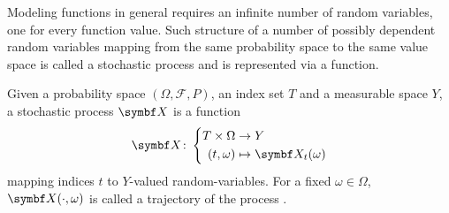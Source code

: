 Modeling functions in general requires an infinite number of random variables, one for every function value.
Such structure of a number of possibly dependent random variables mapping from the same probability space to the same value space is called a stochastic process and is represented via a function.
\begin{definition}
    \label{def:gp:stochastic_process}
    Given a probability space $(\Omega, \mathcal{F}, P)$, an index set $T$ and a measurable space $Y$, a stochastic process $\rv{X}$ is a function
    \begin{align}
        \rv{X} \colon \left\{\begin{aligned}
            T \times \Omega & \to Y                    \\
            (t, \omega)     & \mapsto \rv{X}_t(\omega)
        \end{aligned}\right.
    \end{align}
    mapping indices $t$ to $Y$-valued random-variables.
    For a fixed $\omega \in \Omega$, $\rv{X}(\cdot, \omega)$ is called a trajectory of the process \cite{astrom_introduction_1971}.
\end{definition}

